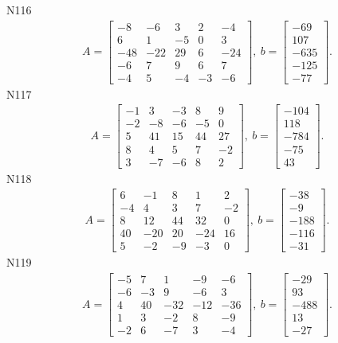 \documentclass[11pt]{report}
\begin{document}
N116
\begin{align*}
 A = \left[\begin{matrix}-8 & -6 & 3 & 2 & -4\\6 & 1 & -5 & 0 & 3\\-48 & -22 & 29 & 6 & -24\\-6 & 7 & 9 & 6 & 7\\-4 & 5 & -4 & -3 & -6\end{matrix}\right],
\ b = \left[\begin{matrix}-69\\107\\-635\\-125\\-77\end{matrix}\right]. 
 \end{align*}
N117
\begin{align*}
 A = \left[\begin{matrix}-1 & 3 & -3 & 8 & 9\\-2 & -8 & -6 & -5 & 0\\5 & 41 & 15 & 44 & 27\\8 & 4 & 5 & 7 & -2\\3 & -7 & -6 & 8 & 2\end{matrix}\right],
\ b = \left[\begin{matrix}-104\\118\\-784\\-75\\43\end{matrix}\right]. 
 \end{align*}
N118
\begin{align*}
 A = \left[\begin{matrix}6 & -1 & 8 & 1 & 2\\-4 & 4 & 3 & 7 & -2\\8 & 12 & 44 & 32 & 0\\40 & -20 & 20 & -24 & 16\\5 & -2 & -9 & -3 & 0\end{matrix}\right],
\ b = \left[\begin{matrix}-38\\-9\\-188\\-116\\-31\end{matrix}\right]. 
 \end{align*}
N119
\begin{align*}
 A = \left[\begin{matrix}-5 & 7 & 1 & -9 & -6\\-6 & -3 & 9 & -6 & 3\\4 & 40 & -32 & -12 & -36\\1 & 3 & -2 & 8 & -9\\-2 & 6 & -7 & 3 & -4\end{matrix}\right],
\ b = \left[\begin{matrix}-29\\93\\-488\\13\\-27\end{matrix}\right]. 
 \end{align*}
\end{document}
